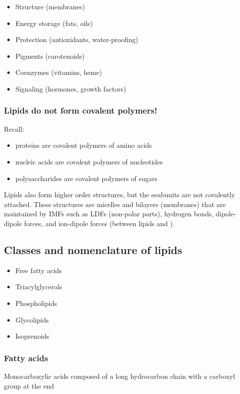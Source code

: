 \documentclass[letterpaper, 12pt]{article}
\begin{document}
\begin{itemize}
\item Structure (membranes)
\item Energy storage (fats, oils)
\item Protection (antioxidants, water-proofing)
\item Pigments (carotenoids)
\item Coenzymes (vitamins, heme)
\item Signaling (hormones, growth factors)
\end{itemize}

\subsubsection*{Lipids do not form covalent polymers!}
Recall:

\begin{itemize}
\item proteins are covalent polymers of amino acids
\item nucleic acids are covalent polymers of nucleotides
\item polysaccharides are covalent polymers of sugars
\end{itemize}

Lipids also form higher order structures, but the esubunits are not covalently attached. These structures are micelles and bilayers (membranes) that are maintained by IMFs such as LDFs (non-polar parts), hydrogen bonds, dipole-dipole forces, and ion-dipole forces (between lipids and ).

\subsection*{Classes and nomenclature of lipids}

\begin{itemize}
\item Free fatty acids
\item Triacylglycerols
\item Phospholipids
\item Glycolipids
\item Isoprenoids
\end{itemize}

\subsubsection*{Fatty acids}
Monocarboxylic acids composed of a long hydrocarbon chain with a carboxyl group at the end
\end{document}
